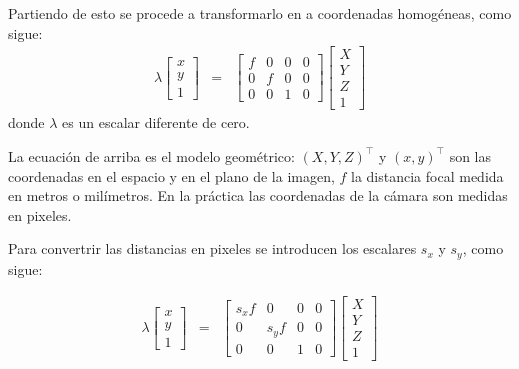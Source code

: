 Partiendo de esto se procede a transformarlo en a coordenadas homogéneas, como sigue:
\begin{equation}
\begin{aligned}
\lambda\left[\begin{array}{cc}x\\y\\1\end{array}\right]
 & = & \left[\begin{array}{cccc}
f & 0 & 0 & 0\\
0 & f & 0 & 0\\
0 & 0 & 1 & 0
\end{array}\right]
\left[\begin{array}{c}X\\Y\\Z\\1\end{array}\right]
\end{aligned}
\label{eq:ProyMatrix}
\end{equation}
donde $\lambda$ es un escalar diferente de cero.

La ecuación de arriba es el modelo geométrico: $(X,Y,Z)^\top$ y $(x,y)^\top$ son las coordenadas en el espacio y en el plano de la imagen, $f$ la distancia focal medida en metros o milímetros. En la práctica las coordenadas de la cámara son medidas en pixeles.

Para convertrir las distancias en pixeles se introducen los escalares $s_x$ y $s_y$, como sigue:

\begin{equation}
\begin{aligned}
\lambda\left[\begin{array}{cc}x\\y\\1\end{array}\right]
 & = & \left[\begin{array}{cccc}
s_xf & 0 & 0 & 0\\
0 & s_yf & 0 & 0\\
0 & 0 & 1 & 0
\end{array}\right]
\left[\begin{array}{c}X\\Y\\Z\\1\end{array}\right]
\end{aligned}
\label{eq:ProyMatrix_2}
\end{equation}

